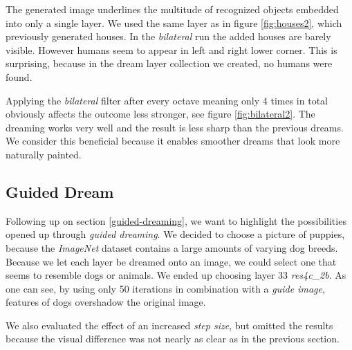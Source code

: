 The generated image underlines the multitude of recognized objects embedded into only a single layer.
We used the same layer as in figure \ref{fig:houses2}, which previously generated houses.
In the \emph{bilateral} run the added houses are barely visible.
However humans seem to appear in left and right lower corner.
This is surprising, because in the dream layer collection we created, no humans were found.

Applying the \emph{bilateral} filter after every octave meaning only 4 times in total obviously affects the outcome less stronger, see figure \ref{fig:bilateral2}.
The dreaming works very well and the result is less sharp than the previous dreams.
We consider this beneficial because it enables smoother dreams that look more naturally painted.





\subsection{Guided Dream}
\label{sec:withguide}
Following up on section \ref{guided-dreaming}, we want to highlight the possibilities opened up through \textit{guided dreaming}.
We decided to choose a picture of puppies, because the \emph{ImageNet} dataset contains a large amounts of varying dog breeds.
Because we let each layer be dreamed onto an image, we could select one that seems to resemble dogs or animals.
We ended up choosing layer 33 \emph{res4c\_2b}.
As one can see, by using only 50 iterations in combination with a \textit{guide image}, features of dogs overshadow the original image.

We also evaluated the effect of an increased \emph{step size}, but omitted the results because the visual difference was not nearly as clear as in the previous section.

